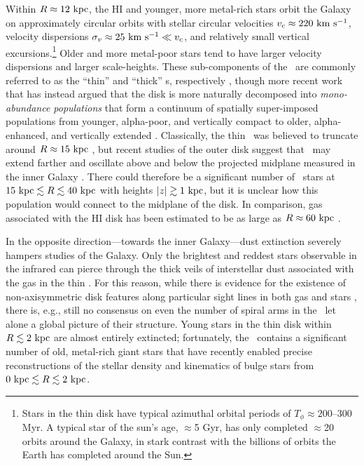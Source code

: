 
Within $R\approx 12~\mathrm{kpc}$, the HI and younger, more metal-rich stars orbit the
Galaxy on approximately circular orbits with stellar circular velocities $v_c
\approx 220~\mathrm{km}~\mathrm{s}^{-1}$, velocity dispersions $\sigma_v \approx 25~\mathrm{km}~\mathrm{s}^{-1} \ll v_c$, and
relatively small vertical excursions.\footnote{Stars in the thin disk have
typical azimuthal orbital periods of $T_\phi \approx 200$--300 Myr. A typical
star of the sun's age, $\approx$5 Gyr, has only completed $\approx$20 orbits
around the Galaxy, in stark contrast with the billions of orbits the Earth has
completed around the Sun.} Older and more metal-poor stars tend to have larger
velocity dispersions and larger scale-heights. These sub-components of the
\mwdisk\ are commonly referred to as the ``thin'' and ``thick'' \mwdisk s,
respectively \citep{gilmore83}, though more recent work that has instead argued
that the disk is more naturally decomposed into \emph{mono-abundance
populations} that form a continuum of spatially super-imposed populations from
younger, alpha-poor, and vertically compact to older, alpha-enhanced, and
vertically extended \citep[see, e.g., Figure~12 and Section~6 in][]{rixbovy13,
bovy12-nothickdisk}. Classically, the thin \mwdisk\ was believed to truncate
around $R \approx 15~\mathrm{kpc}$ \citep[e.g.,][]{robin92}, but recent studies of the
outer disk suggest that \mwdisk\ may extend farther and oscillate above and
below the projected midplane measured in the inner Galaxy \citep{xu15,
apw15-triand}. There could therefore be a significant number of \mwdisk\ stars
at $15~\mathrm{kpc} \lesssim R \lesssim 40~\mathrm{kpc}$ with heights $|z| \gtrsim 1~\mathrm{kpc}$, but
it is unclear how this population would connect to the midplane of the disk. In
comparison, gas associated with the HI disk has been estimated to be as large as
$R \approx 60~\mathrm{kpc}$ \citep{kalberla08}.

In the opposite direction---towards the inner Galaxy---dust extinction severely
hampers studies of the Galaxy. Only the brightest and reddest stars observable
in the infrared can pierce through the thick veils of interstellar dust
associated with the gas in the thin \mwdisk. For this reason, while there is
evidence for the existence of non-axisymmetric disk features along particular
sight lines in both gas and stars \citep[e.g.,][]{levine06, reid14}, there is,
e.g., still no consensus on even the number of spiral arms in the \mwdisk\ let
alone a global picture of their structure. Young stars in the thin disk within
$R \lesssim 2~\mathrm{kpc}$ are almost entirely extincted; fortunately, the \mwbulge\
contains a significant number of old, metal-rich giant stars that have recently
enabled precise reconstructions of the stellar density and kinematics of bulge
stars from $0~\mathrm{kpc} \lesssim R \lesssim 2~\mathrm{kpc}$.

